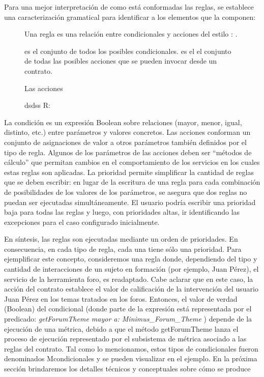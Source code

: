 \begin{itemize}
Para una mejor interpretación de como está conformadas las reglas, se establece una caracterización gramatical para identificar a los elementos que la componen:

\begin{center}
 

\begin{figure}


Una regla es una relación entre condicionales y acciones del estilo \Re:  \rightarrow {}. 

 es el conjunto de todos los posibles condicionales. 
 es el el conjunto de todas las posibles acciones que se pueden  invocar desde un contrato. 

Las acciones 

dsdss
R:

\label{fig:representación_reglas}
\end{figure}


\end{center}


La condición es un expresión Boolean sobre relaciones (mayor, menor,
igual, distinto, etc.) entre parámetros y valores concretos.
Las acciones conforman un conjunto de asignaciones de valor a otros parámetros
también definidos por el tipo de regla. Algunos de los parámetros de
las acciones deben ser “métodos de cálculo” que permitan cambios en el comportamiento
de los servicios en los cuales estas reglas son aplicadas.
La prioridad permite simplificar la cantidad de reglas que se deben escribir:
en lugar de la escritura de una regla para cada combinación de posibilidades
de los valores de los parámetros, se asegura que dos reglas no puedan ser
ejecutadas simultáneamente. El usuario podría escribir una prioridad baja para
todas las reglas y luego, con prioridades altas, ir identificando las excepciones
para el caso configurado inicialmente.

En síntesis, las reglas son ejecutadas mediante un orden de prioridades. En
consecuencia, en cada tipo de regla, cada una tiene sólo una prioridad.
Para ejemplificar este concepto, consideremos una regla donde, dependiendo
del tipo y cantidad de interacciones de un sujeto en formación (por
ejemplo, Juan Pérez), el servicio de la herramienta foro, es readaptado. Cabe
aclarar que en este caso, la acción del contrato establece el valor de calificación
de la intervención del usuario Juan Pérez en los temas tratados en los
foros. Entonces, el valor de verdad (Boolean) del condicional (donde parte de
la expresión está representada por el predicado: \textit{getForumTheme mayor a:
Minimus\_Forum\_Theme} ) depende de la ejecución de una métrica, debido a
que el método getForumTheme lanza el proceso de ejecución representado por
el subsistema de métrica asociado a las reglas del contrato.
Tal como lo mencionamos, estos tipos de condicionales fueron denominados
Mcondicionales y se pueden visualizar en el ejemplo. En la próxima sección
brindaremos los detalles técnicos y conceptuales sobre cómo se produce


\end{itemize}
